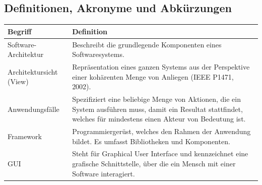 \documentclass[fontsize=12pt,paper=a4,twoside]{scrartcl}
\begin{document}
\subsection{Definitionen, Akronyme und Abkürzungen}
  \begin{longtable}{ |  l | p{12cm} |}
    \hline
    Begriff & Definition \\ \hline
Software-Architektur &Beschreibt die grundlegende Komponenten eines
Softwaresystems.\\ \hline
Architektursicht (View) &Repräsentation eines ganzen Systems
aus der Perspektive einer kohärenten Menge von
Anliegen (IEEE P1471, 2002). \\ \hline
 Anwendungsfälle & Spezifiziert eine beliebige Menge von Aktionen, die
ein System ausführen muss, damit ein Resultat stattfindet,
welches für mindestens einen Akteur von Bedeutung
ist. \\ \hline
    Framework &Programmiergerüst, welches den Rahmen der Anwendung
bildet. Es umfasst Bibliotheken und Komponenten. \\ \hline
GUI &Steht für Graphical User Interface und kennzeichnet
eine grafische Schnittstelle, über die ein Mensch mit
einer Software interagiert.\\ \hline
 

\end{longtable}
\end{document}

